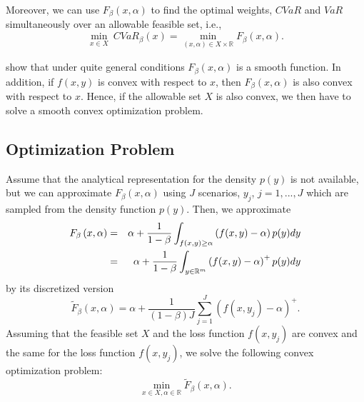 \documentclass[a4paper,12pt]{report}
\begin{document}
Moreover, we can use $F_{\beta }\left( x,\alpha \right) $ to find the optimal weights, $CVaR$ and
$VaR$ simultaneously over an allowable feasible set, i.e.,
\begin{equation}
\underset{x\in X}{\min }~CVaR_{\beta }(x)=\underset{}{\underset{\left(
		x,\alpha \right) \in X\times
		\mathbb{R}
	}{\min }F_{\beta }\left( x,\alpha \right) }.  \label{eight}
\end{equation}

\citet*{pflug2000} show that under quite general conditions $F_{\beta
}\left( x,\alpha \right) $ is a smooth function. In addition, if $f(x,y)$ is
convex with respect to $x$, then $F_{\beta }\left( x,\alpha \right) $ is
also convex with respect to $x$. Hence, if the allowable set $X$ is also
convex, we then have to solve a smooth convex optimization problem.

\vspace{0.6cm}

\subsection{Optimization Problem}

Assume that the analytical representation for the density $p(y)$ is not
available, but we can approximate $F_{\beta }\left( x,\alpha \right) $ using
$J$ scenarios, $y_{j}$, $j=1,...,J$ which are sampled from the density
function $p(y)$. Then, we approximate
\begin{eqnarray}
F_{\beta }\left( x,\alpha \right) &=&\alpha +\frac{1}{1-\beta }%
\int_{f(x,y)\geq \alpha }\left( f(x,y)-\alpha \right) p(y)dy  \notag \\
&=&\alpha +\frac{1}{1-\beta }\int_{y\in
	\mathbb{R}
	^{m}}\left( f(x,y)-\alpha \right) ^{+}p(y)dy  \label{fb}
\end{eqnarray}%
by its discretized version
\begin{equation*}
\widetilde{F}_{\beta }\left( x,\alpha \right) =\alpha +\frac{1}{\left(
	1-\beta \right) J}\sum_{j=1}^{J}\left( f(x,y_{j})-\alpha \right) ^{+}.
\end{equation*}%
Assuming that the feasible set $X$ and the loss
function $f(x,y_{j})$ are convex and the same for the loss
function $f(x,y_{j})$, we solve the following convex optimization problem:
\begin{equation}
\underset{x\in X,\alpha \in
	\mathbb{R}
}{\min }\widetilde{F}_{\beta }\left( x,\alpha \right) .  \label{ten}
\end{equation}
\end{document}

